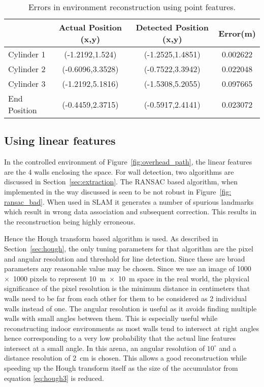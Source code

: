 \begin{table}
\caption{Errors in environment reconstruction using point features.}
\label{tab:cylinder_results}
\begin{tabular}{| l | c | c | c |}
\hline ~ & Actual Position (x,y) & Detected Position (x,y) & Error(m)\\
\hline Cylinder 1 & (-1.2192,1.524) & (-1.2525,1.4851) & 0.002622 \\ 
\hline Cylinder 2 & (-0.6096,3.3528) & (-0.7522,3.3942) & 0.022048 \\ 
\hline Cylinder 3 & (-1.2192,5.1816) & (-1.5308,5.2055) & 0.097665 \\ 
\hline End Position & (-0.4459,2.3715) & (-0.5917,2.4141) & 0.023072 \\
\hline 
\end{tabular} 
\end{table}

\subsection{Using linear features}
\label{sec: hough_results}

In the controlled environment of Figure~\ref{fig:overhead_path}, the linear features are the 4 walls enclosing the space. For wall detection, two algorithms are discussed in Section~\ref{sec:extraction}. The RANSAC based algorithm, when implemented in the way discussed is seen to be not robust in Figure~\ref{fig: ransac_bad}. When used in SLAM it generates a number of spurious landmarks which result in wrong data association and subsequent correction. This results in the reconstruction being highly erroneous. 

Hence the Hough transform based algorithm is used. As described in Section~\ref{sec:hough}, the only tuning parameters for that algorithm are the pixel and angular resolution and threshold for line detection. Since these are broad parameters any reasonable value may be chosen. Since we use an image of 1000~$ \times $~1000 pixels to represent 10~m~$ \times $~10~m space in the real world, the physical significance of the pixel resolution is the minimum distance in centimeters that walls need to be far from each other for them to be considered as 2 individual walls instead of one. The angular resolution is useful as it avoids finding multiple walls with small angles between them. This is especially useful while reconstructing indoor environments as most walls tend to intersect at right angles hence corresponding to a very low probability that the actual line features intersect at a small angle. In this arena, an angular resolution of $ 10^\circ $ and a distance resolution of 2~cm is chosen. This allows a good reconstruction while speeding up the Hough transform itself as the size of the accumulator from equation \ref{eq:hough3} is reduced. 

